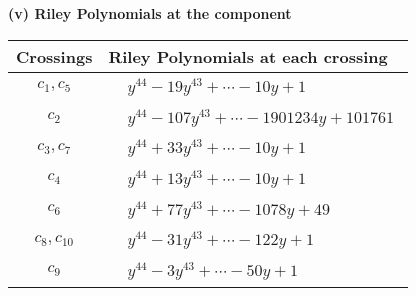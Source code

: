 \documentclass[1p]{elsarticle_modified}
\theoremstyle{definition}
\begin{document}
\newpage\renewcommand{\arraystretch}{1}
\flushleft \textbf{(v) Riley Polynomials at the component}\newline \\
\begin{tabular}{m{50pt}|m{274pt}}
Crossings & \hspace{64pt}Riley Polynomials at each crossing \\
\hline $$\begin{aligned}c_{1},c_{5}\end{aligned}$$&$\begin{aligned}
&y^{44}-19 y^{43}+\cdots-10 y+1
\end{aligned}$\\
\hline $$\begin{aligned}c_{2}\end{aligned}$$&$\begin{aligned}
&y^{44}-107 y^{43}+\cdots-1901234 y+101761
\end{aligned}$\\
\hline $$\begin{aligned}c_{3},c_{7}\end{aligned}$$&$\begin{aligned}
&y^{44}+33 y^{43}+\cdots-10 y+1
\end{aligned}$\\
\hline $$\begin{aligned}c_{4}\end{aligned}$$&$\begin{aligned}
&y^{44}+13 y^{43}+\cdots-10 y+1
\end{aligned}$\\
\hline $$\begin{aligned}c_{6}\end{aligned}$$&$\begin{aligned}
&y^{44}+77 y^{43}+\cdots-1078 y+49
\end{aligned}$\\
\hline $$\begin{aligned}c_{8},c_{10}\end{aligned}$$&$\begin{aligned}
&y^{44}-31 y^{43}+\cdots-122 y+1
\end{aligned}$\\
\hline $$\begin{aligned}c_{9}\end{aligned}$$&$\begin{aligned}
&y^{44}-3 y^{43}+\cdots-50 y+1
\end{aligned}$\\
\hline
\end{tabular}\\~\\
\end{document}
